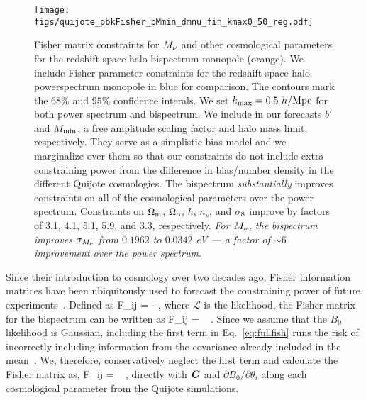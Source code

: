 \begin{figure}
\begin{center}
    \texttt{[image: figs/quijote\_pbkFisher\_bMmin\_dmnu\_fin\_kmax0\_50\_reg.pdf]} 
    \caption{Fisher matrix constraints for $M_\nu$ and other cosmological parameters 
        for the redshift-space halo bispectrum monopole (orange). We include Fisher
        parameter constraints for the redshift-space halo powerspectrum monopole in blue 
        for comparison. The contours mark the $68\%$ and $95\%$ confidence interals. 
        We set $k_{\rm max} = 0.5~h/{\rm Mpc}$ for both power spectrum and bispectrum. 
        We include in our forecasts $b'$ and $M_{\rm min}$, a free amplitude scaling 
        factor and halo mass limit, respectively. They serve as a simplistic bias model 
        and we marginalize over them so that our constraints do not include extra 
        constraining power from the difference in bias/number density in the different 
        Quijote cosmologies. The bispectrum {\em substantially} improves constraints on all of the cosmological 
        parameters over the power spectrum. Constraints on $\Omega_{\rm m}$, $\Omega_{\rm b}$, $h$, $n_s$, and $\sigma_8$
        improve by factors of 3.1, 4.1, 5.1, 5.9, and 3.3, respectively. {\em For $M_\nu$, the
        bispectrum improves $\sigma_{M_\nu}$ from $0.1962$ to $0.0342$ eV --- a factor 
        of ${\sim}6$ improvement over the power spectrum}.}
\label{fig:bk_fish_05}
\end{center}
\end{figure}

Since their introduction to cosmology over two decades ago, Fisher information 
matrices have been ubiquitously used to forecast the constraining power of future 
experiments~\citep[\emph{e.g.}][]{jungman1996,tegmark1997,dodelson2003,heavens2009,verde2010}. 
Defined as 
\beq 
F_{ij} = - \bigg \langle {} \bigg \rangle,
\eeq
where $\mathcal{L}$ is the likelihood, the Fisher matrix for the bispectrum can 
be written as 
\beq \label{eq:fullfish} 
F_{ij} = ~ .
\eeq
Since we assume that the $B_0$ likelihood is Gaussian, including the first 
term in Eq.~\ref{eq:fullfish} runs the risk of incorrectly including information 
from the covariance already included in the mean~\citep{carron2013}. We, therefore,
conservatively neglect the first term and calculate the Fisher matrix as, 
\beq \label{eq:fisher}
F_{ij} = ~ ,
\eeq
directly with $\textbf{\textit{C}}$ and $\partial B_0/\partial \theta_i$ along each cosmological 
parameter from the Quijote simulations. 

